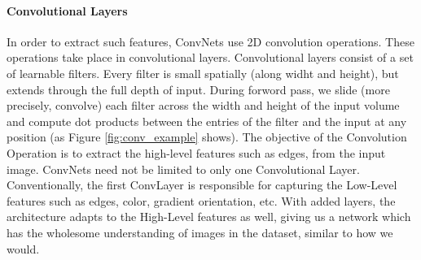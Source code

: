 \documentclass{report}
\begin{document}
\paragraph{Convolutional Layers}
In order to extract such features, ConvNets use 2D convolution operations. These operations take place in convolutional layers. Convolutional
layers consist of a set of learnable filters. Every filter is small spatially (along widht and height), but extends through the full depth of
input. During forword pass, we slide (more precisely, convolve) each filter across the width and height of the input volume and compute dot
products between the entries of the filter and the input at any position (as Figure \ref{fig:conv_example} shows). The objective of the
Convolution Operation is to extract the high-level features such as edges, from the input image. ConvNets need not be limited to only one
Convolutional Layer. Conventionally, the first ConvLayer is responsible for capturing the Low-Level features such as edges, color, gradient
orientation, etc. With added layers, the architecture adapts to the High-Level features as well, giving us a network which has the wholesome
understanding of images in the dataset, similar to how we would.
\end{document}

